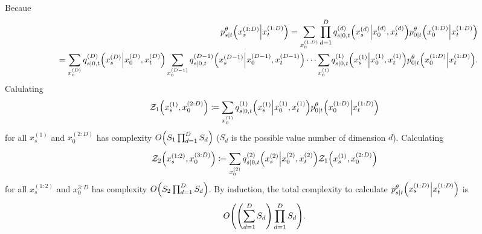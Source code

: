 \documentclass[10pt]{article}
\begin{document}
Becaue
\begin{eqnarray*}
  &&p^\theta_{s|t}\qty(x_s^{(1:D)}\middle|x_t^{(1:D)}) = \sum_{x_0^{(1:D)}}\prod_{d=1}^D q_{s|0,t}^{(d)}\qty(x_s^{(d)}\middle|x_0^{(d)}, x_t^{(d)})p^\theta_{0|t}\qty(x_0^{(1:D)}\middle|x_t^{(1:D)})\\
  &&=\sum_{x_0^{(D)}}q_{s|0,t}^{(D)}\qty(x_s^{(D)}\middle|x_0^{(D)}, x_t^{(D)})\sum_{x_0^{(D-1)}}q_{s|0,t}^{(D-1)}\qty(x_s^{(D-1)}\middle|x_0^{(D-1)}, x_t^{(D-1)})\cdots\sum_{x_0^{(1)}}q_{s|0,t}^{(1)}\qty(x_s^{(1)}\middle|x_0^{(1)}, x_t^{(1)})p^\theta_{0|t}\qty(x_0^{(1:D)}\middle|x_t^{(1:D)}).
\end{eqnarray*}
Calulating
\begin{eqnarray*}
  \mathcal{Z}_1\qty(x_s^{(1)},x_0^{(2:D)})\coloneq\sum_{x_0^{(1)}}q_{s|0,t}^{(1)}\qty(x_s^{(1)}\middle|x_0^{(1)}, x_t^{(1)})p^\theta_{0|t}\qty(x_0^{(1:D)}\middle|x_t^{(1:D)})
\end{eqnarray*}
for all $x_s^{(1)}$ and $x_0^{(2:D)}$ has complexity $O\qty(S_1\prod_{d=1}^D S_d)$ ($S_d$ is the possible value number of dimension $d$). Calculating
\begin{eqnarray*}
  \mathcal{Z}_2\qty(x_s^{(1:2)},x_0^{(3:D)})\coloneq\sum_{x_0^{(2)}}q_{s|0,t}^{(2)}\qty(x_s^{(2)}\middle|x_0^{(2)}, x_t^{(2)})\mathcal{Z}_1\qty(x_s^{(1)},x_0^{(2:D)})
\end{eqnarray*}
for all $x_s^{(1:2)}$ and $x_0^{3:D}$ has complexity $O\qty(S_2\prod_{d=1}^D S_d)$. By induction, the total complexity to calculate $p^\theta_{s|t}\qty(x_s^{(1:D)}\middle|x_t^{(1:D)})$ is
\begin{eqnarray*}
  O\qty(\qty(\sum_{d=1}^D S_d)\prod_{d=1}^D S_d).
\end{eqnarray*}
\end{document}
